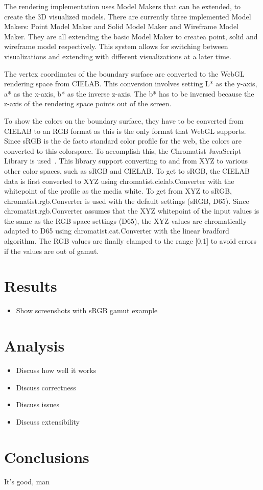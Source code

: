The rendering implementation uses Model Makers that can be extended, to create the 3D visualized models.
There are currently three implemented Model Makers: Point Model Maker and Solid Model Maker and Wireframe Model Maker.
They are all extending the basic Model Maker to createa point, solid and wireframe model respectively.
This system allows for switching between visualizations and extending with different visualizations at a later time.

The vertex coordinates of the boundary surface are converted to the WebGL rendering space from CIELAB.
This conversion involves setting L* as the y-axis, a* as the x-axis, b* as the inverse z-axis.
The b* has to be inversed because the z-axis of the rendering space points out of the screen.

To show the colors on the boundary surface, they have to be converted from CIELAB to an RGB format as this is the only format that WebGL supports.
Since sRGB is the de facto standard color profile for the web, the colors are converted to this colorspace.
To accomplish this, the Chromatist JavaScript Library is used~\cite{Chromatist}.
This library support converting to and from XYZ to various other color spaces, such as sRGB and CIELAB.
To get to sRGB, the CIELAB data is first converted to XYZ using chromatist.cielab.Converter with the whitepoint of the profile as the media white.
To get from XYZ to sRGB, chromatist.rgb.Converter is used with the default settings (sRGB, D65).
Since chromatist.rgb.Converter assumes that the XYZ whitepoint of the input values is the same as the RGB space settings (D65), the XYZ values are chromatically adapted to D65 using chromatist.cat.Converter with the linear bradford algorithm.
The RGB values are finally clamped to the range [0,1] to avoid errors if the values are out of gamut.

\section{Results}
\begin{itemize}
	\item Show screenshots with sRGB gamut example
\end{itemize}

\section{Analysis}
\begin{itemize}
	\item Discuss how well it works
	\item Discuss correctness
	\item Discuss issues
	\item Discuss extensibility
\end{itemize}

\section{Conclusions}
It's good, man


